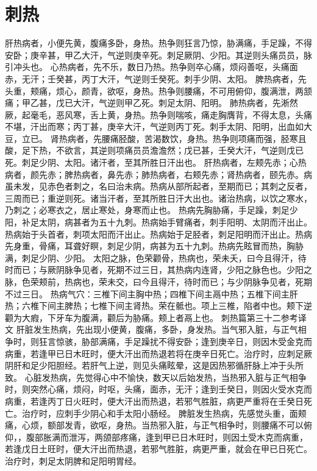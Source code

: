 \documentclass[a4paper,12pt,UTF8,twoside]{ctexbook}
\begin{document}
\chapter{刺热}
肝热病者，小便先黄，腹痛多卧，身热。热争则狂言乃惊，胁满痛，手足躁，不得安卧；庚辛甚，甲乙大汗，气逆则庚辛死。刺足厥阴、少阳。其逆则头痛员员，脉引冲头也。
心热病者，先不乐，数日乃热。热争则卒心痛，烦闷善呕，头痛面赤，无汗；壬癸甚，丙丁大汗，气逆则壬癸死。刺手少阴、太阳。
脾热病者，先头重，颊痛，烦心，颜青，欲呕，身热。热争则腰痛，不可用俯仰，腹满泄，两颔痛；甲乙甚，戊已大汗，气逆则甲乙死。刺足太阴、阳明。
肺热病者，先淅然厥，起毫毛，恶风寒，舌上黄，身热。热争则喘咳，痛走胸膺背，不得太息，头痛不堪，汗出而寒；丙丁甚，庚辛大汗，气逆则丙丁死。刺手太阴、阳明，出血如大豆，立已。
肾热病者，先腰痛胫酸，苦渴数饮，身热。热争则项痛而强，胫寒且酸，足下热，不欲言，其逆则项痛员员澹澹然；戊已甚，壬癸大汗，气逆则戊已死。刺足少阴、太阳。诸汗者，至其所胜日汗出也。
肝热病者，左颊先赤；心热病者，颜先赤；脾热病者，鼻先赤；肺热病者，右颊先赤；肾热病者，颐先赤。病虽未发，见赤色者刺之，名曰治未病。热病从部所起者，至期而已；其刺之反者，三周而已；重逆则死。诸当汗者，至其所胜日汗大出也。诸治热病，以饮之寒水，乃刺之；必寒衣之，居止寒处，身寒而止也。
热病先胸胁痛，手足躁，刺足少阳，补足太阴，病甚者为五十九刺。热病始手臂痛者，刺手阳明、太阴而汗出止。热病始于头首者，刺项太阳而汗出止。热病始于足胫者，刺足阳明而汗出止。热病先身重，骨痛，耳聋好瞑，刺足少阴，病甚为五十九刺。热病先眩冒而热，胸胁满，刺足少阴、少阳。
太阳之脉，色荣颧骨，热病也，荣未夭，曰今且得汗，待时而已；与厥阴脉争见者，死期不过三日，其热病内连肾，少阳之脉色也。少阳之脉，色荣颊前，热病也，荣未交，曰今且得汗，待时而已；与少阴脉争见者，死期不过三日。
热病气穴：三椎下间主胸中热；四椎下间主鬲中热；五椎下间主肝热；六椎下间主脾热；七椎下间主肾热。荣在骶也。项上三椎，陷者中也。颊下逆颧为大瘕，下牙车为腹满，颧后为胁痛。颊上者鬲上也。
刺热篇第三十二参考译文
肝脏发生热病，先出现小便黄，腹痛，多卧，身发热。当气邪入脏，与正气相争时，则狂言惊骇，胁部满痛，手足躁扰不得安卧；逢到庚辛日，则因木受金克而病重，若逢甲已日木旺时，便大汗出而热退若将在庚辛日死亡。治疗时，应刺足厥阴肝和足少阳胆经。若肝气上逆，则见头痛眩晕，这是因热邪循肝脉上冲于头所致。
心脏发热病，先觉得心中不愉快，数天以后始发热，当热邪入脏与正气相争时，则突然心痛，烦闷，时呕，头痛，面赤，无汗；逢到壬癸日，则因火受水克而病重，若逢丙丁日火旺时，便大汗出而热退，若邪气胜脏，病更严重将在壬癸日死亡。治疗时，应刺手少阴心和手太阳小肠经。
脾脏发生热病，先感觉头重，面颊痛，心烦，额部发青，欲呕，身热。当热邪入脏，与正气相争时，则腰痛不可以俯仰，，腹部胀满而泄泻，两颌部疼痛，逢到甲已日木旺时，则因土受木克而病重，若逢戊日土旺时，便大汗出而热退，若邪气胜脏，病更严重，就会在甲已日死亡。治疗时，刺足太阴脾和足阳明胃经。
\end{document}
